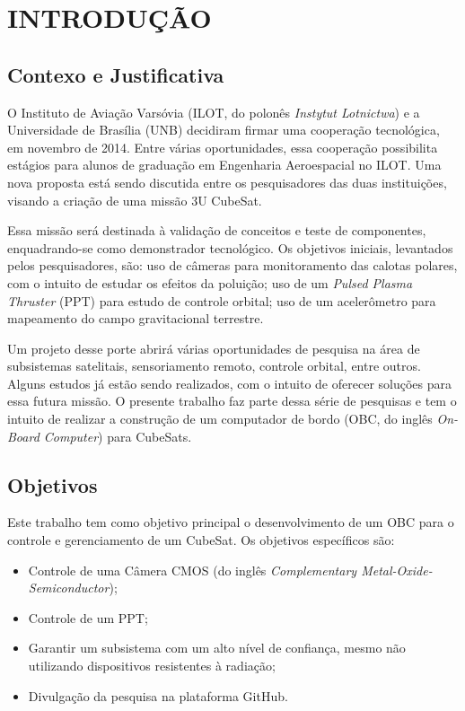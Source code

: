 
\chapter[INTRODUÇÃO]{INTRODUÇÃO}
\section{Contexo e Justificativa}

O Instituto de Aviação Varsóvia (ILOT, do polonês \textit{Instytut Lotnictwa}) e a Universidade de Brasília (UNB) decidiram firmar uma cooperação tecnológica, em novembro de 2014. Entre várias oportunidades, essa cooperação possibilita estágios para alunos de graduação em Engenharia Aeroespacial no ILOT. Uma nova proposta está sendo discutida entre os pesquisadores das duas instituições, visando a criação de uma missão 3U CubeSat.

Essa missão será destinada à validação de conceitos e teste de componentes, enquadrando-se como demonstrador tecnológico. Os objetivos iniciais, levantados pelos pesquisadores, são: uso de câmeras para monitoramento das calotas polares, com o intuito de estudar os efeitos da poluição; uso de um \textit{Pulsed Plasma Thruster} (PPT) para estudo de controle orbital;  uso de um acelerômetro para mapeamento do campo gravitacional terrestre.

Um projeto desse porte abrirá várias oportunidades de pesquisa na área de subsistemas satelitais, sensoriamento remoto, controle orbital, entre outros. Alguns estudos já estão sendo realizados, com o intuito de oferecer soluções para essa futura missão. O presente trabalho faz parte dessa série de pesquisas e tem o intuito de realizar a construção de um computador de bordo (OBC, do inglês \textit{On-Board Computer}) para CubeSats.



\section{Objetivos}

Este trabalho tem como objetivo principal o desenvolvimento de um OBC para o controle e gerenciamento de um CubeSat.  Os objetivos específicos são:

\begin{itemize}

	\item Controle de uma Câmera CMOS (do inglês \textit{Complementary Metal-Oxide-Semiconductor});
	\item Controle de um PPT;
	\item Garantir um subsistema com um alto nível de confiança, mesmo não utilizando dispositivos resistentes à radiação;
	\item Divulgação da pesquisa na plataforma GitHub.

\end{itemize}



